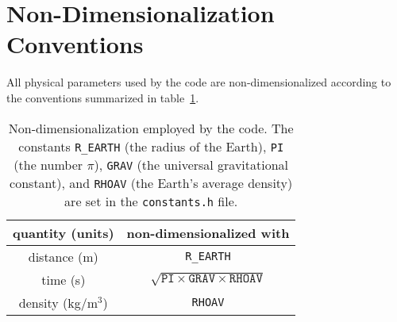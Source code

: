 \documentclass[onecolumn]{article}
\begin{document}
\section{Non-Dimensionalization Conventions}
\label{appendix:conventions}

All physical parameters used by the code are non-dimensionalized according
to the conventions summarized in table~\ref{table:conventions}.
\begin{table}[ht]
\begin{tabular}{|c|c|} \hline
quantity (units) & non-dimensionalized with \\ \hline
distance (m) & \texttt{R\_EARTH} \\
time (s) & $\sqrt{\texttt{PI}\times\texttt{GRAV}\times\texttt{RHOAV}}$ \\
density (kg/m${}^3$) & \texttt{RHOAV} \\ \hline
\end{tabular}
\caption{
Non-dimensionalization employed by the code. The constants
\texttt{R\_EARTH} (the radius of the Earth),
\texttt{PI} (the number $\pi$), \texttt{GRAV} (the universal gravitational constant),
and \texttt{RHOAV} (the Earth's average density)
are set in the \texttt{constants.h} file.
}
\label{table:conventions}
\end{table}
\end{document}

